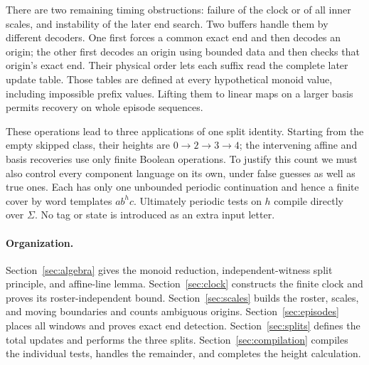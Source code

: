 There are two remaining timing obstructions: failure of the clock or of
all inner scales, and instability of the later end search. Two buffers
handle them by different decoders. One first forces a common exact end and
then decodes an origin; the other first decodes an origin using bounded
data and then checks that origin's exact end. Their physical order lets
each suffix read the complete later update table. Those tables are defined
at every hypothetical monoid value, including impossible prefix values.
Lifting them to linear maps on a larger basis permits recovery on whole
episode sequences.

These operations lead to three applications of one split identity. Starting
from the empty skipped class, their heights are $0\to2\to3\to4$; the
intervening affine and basis recoveries use only finite Boolean operations.
To justify this count we must also control every component language on its
own, under false guesses as well as true ones. Each has only one unbounded
periodic continuation and hence a finite cover by word templates
$a b^h c$. Ultimately periodic tests on $h$ compile directly over $\Sigma$.
No tag or state is introduced as an extra input letter.

\paragraph{Organization.}
Section~\ref{sec:algebra} gives the monoid reduction, independent-witness
split principle, and affine-line lemma. Section~\ref{sec:clock} constructs
the finite clock and proves its roster-independent bound.
Section~\ref{sec:scales} builds the roster, scales, and moving boundaries
and counts ambiguous origins. Section~\ref{sec:episodes} places all windows
and proves exact end detection. Section~\ref{sec:splits} defines the total
updates and performs the three splits. Section~\ref{sec:compilation}
compiles the individual tests, handles the remainder, and completes the
height calculation.
